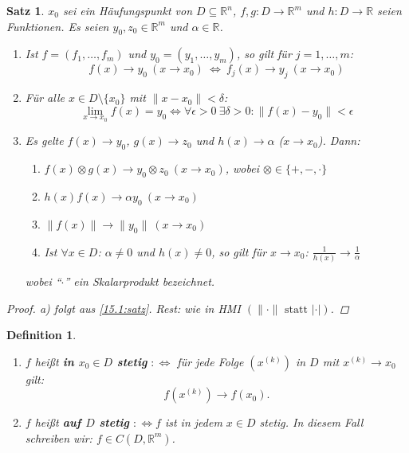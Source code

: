 \documentclass[12pt]{extreport} %
\newcommand{\R}{\mathbb{R}}
\theoremstyle{named}
\theoremstyle{nnamed}
\theoremstyle{itshape}
\newtheorem{satz}[unnamedtheorem]{Satz}
\newtheorem*{definition}{Definition}
\theoremstyle{normal}
\begin{document}
\begin{satz} \label{16.2:satz}
	$x_{0}$ sei ein Häufungspunkt von $D \subseteq \R^{n}$, $f, g \colon D \rightarrow \R^{m}$ und $h \colon D \rightarrow \R$ seien Funktionen. Es seien $y_{0}, z_{0} \in \R^{m}$ und $\alpha \in \R$.
	\begin{enumerate}
		\item Ist $f = (f_{1}, \dotsc, f_{m})$ und $y_{0} = (y_{1}, \dotsc, y_{m})$, so gilt für $j = 1, \dotsc, m$:
			$$ f(x) \rightarrow y_{0} ~(x \rightarrow x_{0}) ~ \iff ~ f_{j}(x) \rightarrow y_{j} ~(x \rightarrow x_{0}) $$
		\item Für alle $x \in D \setminus \{ x_{0} \}$ mit $\| x - x_{0} \| < \delta$:
			 $$ \lim_{x \rightarrow x_{0}} f(x) = y_{0} \iff \forall \epsilon > 0 ~\exists \delta > 0: \| f(x) - y_{0} \| < \epsilon $$
		\item Es gelte $f(x) \rightarrow y_{0}$, $g(x) \rightarrow z_{0}$ und $h(x) \rightarrow \alpha$ ($x \rightarrow x_{0}$). Dann:
			\begin{enumerate}
				\item $f(x) \otimes g(x) \rightarrow y_{0} \otimes z_{0} ~(x \rightarrow x_{0})$, wobei $\otimes \in \{ +, - , \cdot \}$
				\item  $h(x) f(x) \rightarrow \alpha y_{0} ~(x \rightarrow x_{0})$
				\item $\| f(x) \| \rightarrow \| y_{0} \| ~(x\rightarrow x_{0})$
				\item Ist $\forall x \in D$: $\alpha \neq 0$ und $h(x) \neq 0$, so gilt für $x \rightarrow x_{0}$: $\frac{1}{h(x)} \rightarrow \frac{1}{\alpha}$
			\end{enumerate} 
			wobei \enquote{$\cdot$} ein Skalarprodukt bezeichnet.
	\end{enumerate}
	
	\begin{proof}
		a) folgt aus \ref{15.1:satz}. Rest: wie in HMI $\left(\| \cdot \| \text{ statt } | \cdot | \right)$.
	\end{proof}
\end{satz}

 
\begin{definition} ~\
	\begin{enumerate}
		\item $f$ hei{\ss}t \textbf{in $x_{0} \in D$ stetig} $: \iff$ für jede Folge $\left( x^{(k)} \right)$ in $D$ mit $x^{(k)} \rightarrow x_{0}$ gilt:
			$$ f\left( x^{(k)} \right) \rightarrow f\left( x_{0} \right). $$
		\item $f$ hei{\ss}t \textbf{auf $D$ stetig} $: \iff f$ ist in jedem $x \in D$ stetig. In diesem Fall schreiben wir: $f \in C \left( D, \R^{m} \right)$. 
	\end{enumerate}
\end{definition}
\end{document}
